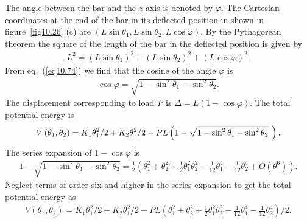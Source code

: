 \documentclass{AeroStructure-ERJohnson}
\begin{document}
{\def\thefigure{10.26}
}

The angle between the bar and the $z$-axis is denoted by $\varphi$. The Cartesian coordinates at the end of the bar in its deflected position in shown in figure~\ref{fig10.26} (c) are $\left(L \sin \theta_{1}, L \sin \theta_{2}, L \cos \varphi\right)$. By the Pythagorean theorem the square of the length of the bar in the deflected position is given by
\begin{align}\label{eq10.74}
L^{2}=\left(L \sin \theta_{1}\right)^{2}+\left(L \sin \theta_{2}\right)^{2}+(L \cos \varphi)^{2}.
\end{align}
From eq.~(\ref{eq10.74}) we find that the cosine of the angle $\varphi$ is
\begin{align}\label{eq10.75}
\cos \varphi=\sqrt{1-\sin ^{2} \theta_{1}-\sin ^{2} \theta_{2}}.
\end{align}
The displacement corresponding to load \textit{P} is $\Delta=L(1-\cos \varphi)$. The total potential energy is
\begin{align}\label{eq10.76}
V\left(\theta_{1}, \theta_{2}\right)=K_{1} \theta_{1}^{2} / 2+K_{2} \theta_{1}^{2} / 2-P L\left(1-\sqrt{1-\sin ^{2} \theta_{1}-\sin ^{2} \theta_{2}}\hspace*{4pt}\right).
\end{align}
The series expansion of $1-\cos \varphi$ is
\begin{align}\label{eq10.77}
1-\sqrt{1-\sin ^{2} \theta_{1}-\sin ^{2} \theta_{2}}=\frac{1}{2}\left(\theta_{1}^{2}+\theta_{2}^{2}+\frac{1}{2} \theta_{1}^{2} \theta_{2}^{2}-\frac{1}{12} \theta_{1}^{4}-\frac{1}{12} \theta_{2}^{4}+O(\theta^{6})\right).
\end{align}
Neglect terms of order six and higher in the series expansion to get the total potential energy as
\begin{align}\label{eq10.78}
V\left(\theta_{1}, \theta_{2}\right)=K_{1} \theta_{1}^{2} / 2+K_{2} \theta_{1}^{2} / 2-P L\left(\theta_{1}^{2}+\theta_{2}^{2}+\frac{1}{2} \theta_{1}^{2} \theta_{2}^{2}-\frac{1}{12} \theta_{1}^{4}-\frac{1}{12} \theta_{2}^{4}\right) / 2.
\end{align}
\end{document}
